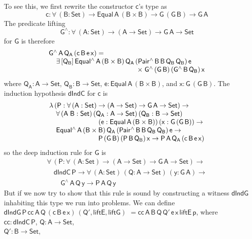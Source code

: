 \documentclass[sigplan,10pt,anonymous,review]{acmart}
\begin{document}
To see this, we first rewrite the constructor $\mathsf{c}$'s type as
\[\mathsf{c : \forall\, (B : Set) \to Equal\,A\,(B \times B)
  \to G\,(G\,B) \to G\,A}\]
The predicate lifting
\[\mathsf{G^{\wedge} : \forall\, (A : Set) \to (A \to Set) \to G\,A \to
  Set}\] for $\mathsf{G}$ is therefore
\[\begin{array}{l}
\mathsf{G^{\wedge}\,A\,Q_A\,(c\,B\,e\,x) =}\\
\mathsf{\hspace*{0.15in}\exists\, [Q_B]\,
Equal^{\wedge}\,A\,(B \times
B)\,Q_A\,(Pair^{\wedge}\,B\,B\,Q_B\,Q_B)\,e}\\
\mathsf{\hspace*{1.8in}\times \;G^{\wedge}\,(G\,B)\,(G^{\wedge}\,B\,Q_B)\,x}
\end{array}\]
where $\mathsf{Q_A : A \to Set}$, $\mathsf{Q_B : B \to Set}$, $\mathsf{e
  : Equal\,A\,(B \times B)}$, and $\mathsf{x : G\,(G\,B)}$.
The induction hypothesis $\mathsf{dIndC}$ for $\mathsf{c}$ is
\[\begin{array}{l}
\mathsf{\lambda\, (P : \forall\, (A : Set) \to (A \to Set) \to G\,A
  \to Set)\to} \\ 
\quad\mathsf{ \forall\, (A\;B : Set)\, (Q_A : A \to Set)\, (Q_B : B
  \to Set)}\\
\hspace*{1in}\mathsf{(e : Equal\,A\,(B \times B))\, (x : G\,(G\,B))\to} \\ 
\quad\mathsf{Equal^{\wedge}\,A\,(B \times
  B)\,Q_A\,(Pair^{\wedge}\,B\,B\,Q_B\,Q_B)\,e \to}\\
\hspace*{1in}\mathsf{P\,(G\,B)\,(P\,B\,Q_B)\,x 
	\to P\,A\,Q_A\,(c\,B\, e\,x)} 
\end{array}\]
so the deep induction rule for $\mathsf{G}$ is
\[\begin{array}{l}
\mathsf{\forall\, (P : \forall\, (A : Set) \to (A \to Set) \to G\,A \to Set)
  \to}\\
\quad\mathsf{dIndC\,P \to \forall\, (A : Set)\, (Q : A \to Set)\, (y : G\,A)
  \to}\\
\quad\quad\mathsf{G^{\wedge}\,A\,Q\,y \to P\,A\,Q\,y}
\end{array}\] But if we now try to show
that this rule is sound by constructing a witness $\mathsf{dIndG}$
inhabiting this type we run into problems. We can define
$\mathsf{dIndG\,P\,cc\,A\,Q\,(c\,B\,e\,x)\,(Q', liftE, liftG)}$
$\mathsf{= cc\,A\,B\,Q\,Q'\,e\,x\,liftE\,p}$, where $\mathsf{cc :
  dIndC\,P}$, $\mathsf{Q : A \to Set}$,\\ $\mathsf{Q' : B \to Set}$,
\end{document}
